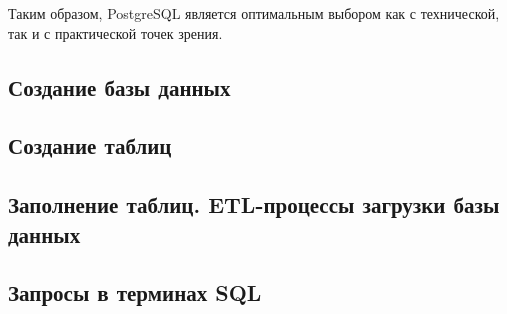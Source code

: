 \documentclass[a4paper]{article}
\begin{document}
Таким образом, PostgreSQL является оптимальным выбором как с технической, так и с
практической точек зрения.

\subsection{Создание базы данных}


\subsection{Создание таблиц}


\subsection{Заполнение таблиц. ETL-процессы загрузки базы данных}
\subsection{Запросы в терминах SQL}
\end{document}
